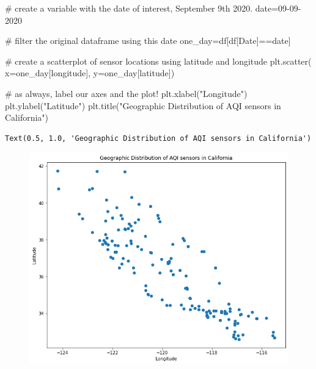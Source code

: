 \documentclass[
  letterpaper,
  DIV=11,
  numbers=noendperiod]{scrreprt}
\newenvironment{Shaded}{\begin{snugshade}}{\end{snugshade}}
\newcommand{\CommentTok}[1]{\textcolor[rgb]{0.37,0.37,0.37}{#1}}
\newcommand{\NormalTok}[1]{\textcolor[rgb]{0.00,0.23,0.31}{#1}}
\newcommand{\OperatorTok}[1]{\textcolor[rgb]{0.37,0.37,0.37}{#1}}
\newcommand{\StringTok}[1]{\textcolor[rgb]{0.13,0.47,0.30}{#1}}
\begin{document}
\begin{Shaded}
\begin{Highlighting}[]
\CommentTok{\# create a variable with the date of interest, September 9th 2020. }
\NormalTok{date}\OperatorTok{=}\StringTok{\textquotesingle{}09{-}09{-}2020\textquotesingle{}}

\CommentTok{\# filter the original dataframe using this date}
\NormalTok{one\_day}\OperatorTok{=}\NormalTok{df[df[}\StringTok{\textquotesingle{}Date\textquotesingle{}}\NormalTok{]}\OperatorTok{==}\NormalTok{date]}

\CommentTok{\# create a scatterplot of sensor locations using latitude and longitude }
\NormalTok{plt.scatter(}
\NormalTok{    x}\OperatorTok{=}\NormalTok{one\_day[}\StringTok{\textquotesingle{}longitude\textquotesingle{}}\NormalTok{],}
\NormalTok{    y}\OperatorTok{=}\NormalTok{one\_day[}\StringTok{\textquotesingle{}latitude\textquotesingle{}}\NormalTok{])}

\CommentTok{\# as always, label our axes and the plot!}
\NormalTok{plt.xlabel(}\StringTok{"Longitude"}\NormalTok{)}
\NormalTok{plt.ylabel(}\StringTok{"Latitude"}\NormalTok{)}
\NormalTok{plt.title(}\StringTok{"Geographic Distribution of AQI sensors in California"}\NormalTok{)}
\end{Highlighting}
\end{Shaded}

\begin{verbatim}
Text(0.5, 1.0, 'Geographic Distribution of AQI sensors in California')
\end{verbatim}

\begin{figure}[H]

{\centering \includegraphics{notebooks/W03. Spatial Data_files/figure-pdf/cell-16-output-2.png}

}

\end{figure}
\end{document}
